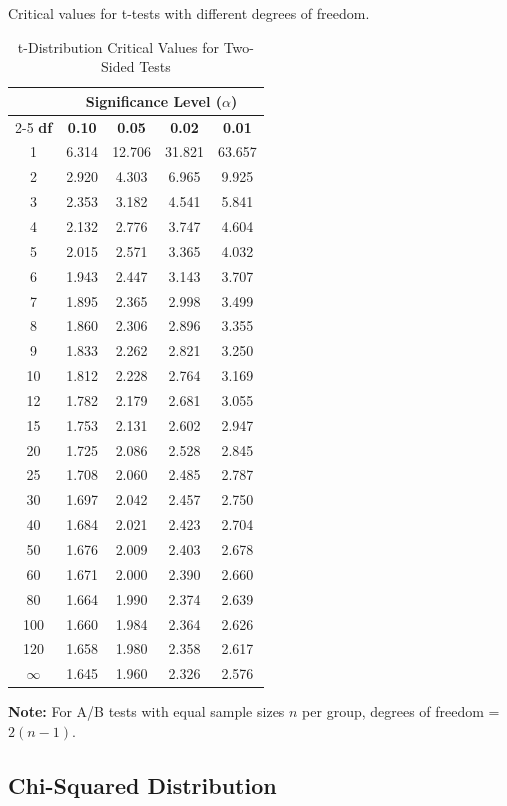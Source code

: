 Critical values for t-tests with different degrees of freedom.

\begin{table}[h]
\centering
\caption{t-Distribution Critical Values for Two-Sided Tests}
\begin{tabular}{ccccc}
\toprule
& \multicolumn{4}{c}{\textbf{Significance Level ($\alpha$)}} \\
\cmidrule{2-5}
\textbf{df} & \textbf{0.10} & \textbf{0.05} & \textbf{0.02} & \textbf{0.01} \\
\midrule
1 & 6.314 & 12.706 & 31.821 & 63.657 \\
2 & 2.920 & 4.303 & 6.965 & 9.925 \\
3 & 2.353 & 3.182 & 4.541 & 5.841 \\
4 & 2.132 & 2.776 & 3.747 & 4.604 \\
5 & 2.015 & 2.571 & 3.365 & 4.032 \\
6 & 1.943 & 2.447 & 3.143 & 3.707 \\
7 & 1.895 & 2.365 & 2.998 & 3.499 \\
8 & 1.860 & 2.306 & 2.896 & 3.355 \\
9 & 1.833 & 2.262 & 2.821 & 3.250 \\
10 & 1.812 & 2.228 & 2.764 & 3.169 \\
12 & 1.782 & 2.179 & 2.681 & 3.055 \\
15 & 1.753 & 2.131 & 2.602 & 2.947 \\
20 & 1.725 & 2.086 & 2.528 & 2.845 \\
25 & 1.708 & 2.060 & 2.485 & 2.787 \\
30 & 1.697 & 2.042 & 2.457 & 2.750 \\
40 & 1.684 & 2.021 & 2.423 & 2.704 \\
50 & 1.676 & 2.009 & 2.403 & 2.678 \\
60 & 1.671 & 2.000 & 2.390 & 2.660 \\
80 & 1.664 & 1.990 & 2.374 & 2.639 \\
100 & 1.660 & 1.984 & 2.364 & 2.626 \\
120 & 1.658 & 1.980 & 2.358 & 2.617 \\
$\infty$ & 1.645 & 1.960 & 2.326 & 2.576 \\
\bottomrule
\end{tabular}
\end{table}

\textbf{Note:} For A/B tests with equal sample sizes $n$ per group, degrees of freedom = $2(n-1)$.

\subsection{Chi-Squared Distribution}

